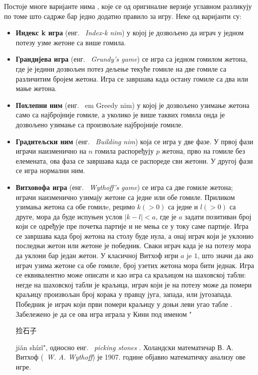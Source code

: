 \documentclass[a4paper]{article}
\begin{document}
Постоје многе варијанте нима \cite{nimvariants}, које се од оригиналне верзије углавном разликују по томе што садрже бар једно додатно правило за игру. Неке од варијанти су:
\begin{itemize}
	\item \textbf{Индекс k игра} (енг. {~\em Index-k nim}) у којој је дозвољено да играч у једном потезу узме жетоне са више гомила. 
	\item \textbf{Грандијева игра} (енг. {~\em Grundy's game}) се игра са једном гомилом жетона, где је једини дозвољен потез дељење текуће гомиле на две гомиле са различитим бројем жетона. Игра се завршава када остану гомиле са два или мање жетона.
	\item \textbf{Похлепни ним} (енг. {~em Greedy nim}) у којој је дозвољено узимање жетона само са најбројније гомиле, а уколико је више таквих гомила онда је дозвољено узимање са произвољне најбројније гомиле.
	\item \textbf{Градитељски ним} (енг. {~\em Building nim}) која се игра у две фазе. У првој фази играчи наизменично на $ n $ гомила распоређују $ p $ жетона, прво на гомиле без елемената, ова фаза се завршава када се распореде сви жетони. У другој фази се игра нормални ним. 
	\item \textbf{Витховофа игра} (енг. {~\em Wythoff's game}) \cite{wythoff1907modification} се игра са две гомиле жетона; играчи наизменично узимају жетоне са једне или обе гомиле. Приликом узимања жетона са обе гомилe, рецимо $ k (> 0) $ са једне и $ l (> 0) $ са друге, мора да буде испуњен услов $ |k - l| < a $, где је $ a $ задати позитиван број који се одређује пре почетка партије и не мења се у току саме партије. Игра се завршава када број жетона на столу буде нула, а онај играч који је уклонио последњи жетон или жетоне је победник. Сваки играч када је на потезу мора да уклони бар један жетон. У класичној Витхоф игри $ a $ je $ 1 $, што значи да ако играч узима жетоне са обе гомиле, број узетих жетона мора бити једнак. Игра се еквивалентно може описати и као игра са краљицом на шаховској табли: негде на шаховској табли је краљица, играч који је на потезу може да помери краљицу произвољан број корака у правцу југа, запада, или југозапада. Победник је играч који први помери краљицу у доњи леви угао табле \cite{cut-the-knot, singingbanana-youtube}. Забележено је да се ова игра играла у Кини  под именом "\begin{CJK}{UTF8}{gbsn}捡石子\end{CJK} jiǎn shízǐ", односно енг. {~\em picking stones} \cite{Yaglom}. Холандски математичар В. А. Витхоф ({~\em W. A. Wythoff}) је 1907. године објавио математичку анализу ове игре. \cite{wythoff1907modification}
\end{itemize}
\end{document}
